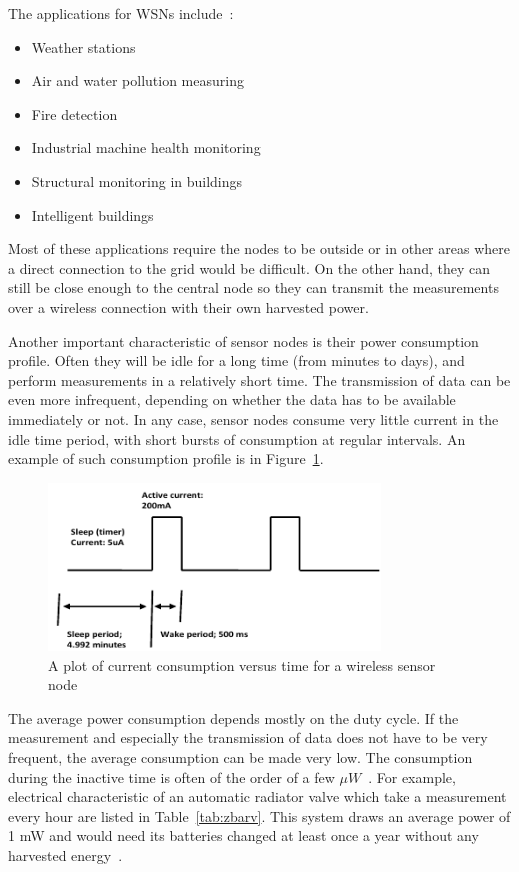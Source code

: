 \documentclass[a4paper,10pt]{article}
\begin{document}
The applications for \acp{WSN} include~\cite{wiki:eh}:
\begin{itemize}
  \item Weather stations
  \item Air and water pollution measuring
  \item Fire detection
  \item Industrial machine health monitoring
  \item Structural monitoring in buildings
  \item Intelligent buildings~\cite{cap-wsn-ieee}
\end{itemize}

Most of these applications require the nodes to be outside or in other areas where a direct connection to the grid would be difficult. On the other hand, they can still be close enough to the central node so they can transmit the measurements over a wireless connection with their own harvested power. 

Another important characteristic of sensor nodes is their power consumption profile. Often they will be idle for a long time (from minutes to days), and perform measurements in a relatively short time. The transmission of data can be even more infrequent, depending on whether the data has to be available immediately or not. In any case, sensor nodes consume very little current in the idle time period, with short bursts of consumption at regular intervals. An example of such consumption profile is in Figure~\ref{fig:wsn-consumption}. 

\begin{figure}[h]
\centering
 \includegraphics[width=250pt]{./Slike/wsn-current-profile}
 \caption{A plot of current consumption versus time for a wireless sensor node~\cite{cap-wsn-ieee}}
\label{fig:wsn-consumption}
\end{figure}

The average power consumption depends mostly on the duty cycle. If the measurement and especially the transmission of data does not have to be very frequent, the average consumption can be made very low. The consumption during the inactive time is often of the order of a few $\mu W$~\cite{Salerno10}. For example, electrical characteristic of an automatic radiator valve which take a measurement every hour are listed in Table~\ref{tab:zbarv}. This system draws an average power of 1 mW and would need its batteries changed at least once a year without any harvested energy~\cite{teg-wsn-ieee}. 
\end{document}
